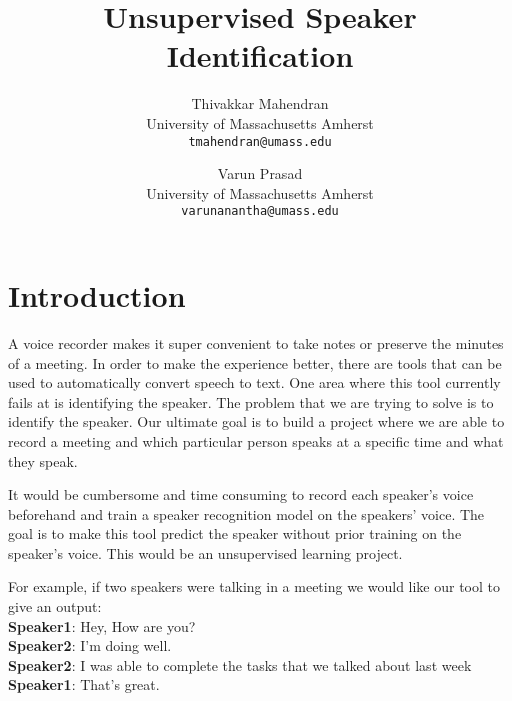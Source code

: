 \documentclass[10pt,twocolumn,letterpaper]{article}
\begin{document}
\title{Unsupervised Speaker Identification}

\author{Thivakkar Mahendran\\
University of Massachusetts Amherst\\
{\tt\small tmahendran@umass.edu}
\and
Varun Prasad\\
University of Massachusetts Amherst\\
{\tt\small varunanantha@umass.edu}
}

\maketitle



\section{Introduction}

A voice recorder makes it super convenient to take notes or preserve the minutes of a meeting. In order to make the experience better, there are tools that can be used to automatically convert speech to text. One area where this tool currently fails at is identifying the speaker. The problem that we are trying to solve is to identify the speaker. Our ultimate goal is to build a project where we are able to record a meeting and which particular person speaks at a specific time and what they speak.

It would be cumbersome and time consuming to record each speaker’s voice beforehand and train a speaker recognition model on the speakers’ voice. The goal is to make this tool predict the speaker without prior training on the speaker’s voice. This would be an unsupervised learning project. 

For example, if two speakers were talking in a meeting we would like our tool to give an output: 
\\  {\bf Speaker1}: Hey, How are you? 
\\ {\bf Speaker2}: I’m doing well.
\\ {\bf Speaker2}: I was able to complete the tasks that we talked about last week
\\ {\bf Speaker1}: That’s great.
\end{document}

